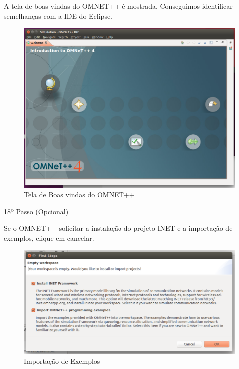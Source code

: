 \documentclass[
12pt,				%
openright,			%
oneside,			%
a4paper,			%
brazil,				%
]{abntex2}
\begin{document}
{\begin{anexosenv}
                \par A tela de boas vindas do OMNET++ é mostrada. Conseguimos identificar semelhanças com a IDE do Eclipse.
		            
                \begin{figure} [H]
	                \centering
	                \includegraphics[scale=.35]{figuras/aneB/57BoasVindasOmnet}
	                \caption{\label{fig_57}Tela de Boas vindas do OMNET++}
                \end{figure}
				\newpage
            	\begin{description}
	                \item[18º Passo (Opcional)]
	            \end{description}
	            \par Se o OMNET++ solicitar a instalação do projeto INET e a importação de exemplos, clique em cancelar.
		            
                \begin{figure} [H]
	                \centering
	                \includegraphics[scale=.4]{figuras/aneB/58CancelandoImportacaoDeExemplos}
	                \caption{\label{fig_58}Importação de Exemplos}
                \end{figure}
				

\end{anexosenv}}
\end{document}
